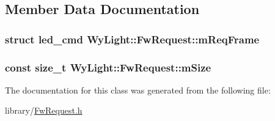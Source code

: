 \subsection{Member Data Documentation}
\hypertarget{class_wy_light_1_1_fw_request_a2c07f543884aab374e5de1c5c7e77b4e}{
\subsubsection[{m\-Req\-Frame}]{\setlength{\rightskip}{0pt plus 5cm}struct led\-\_\-cmd Wy\-Light\-::\-Fw\-Request\-::m\-Req\-Frame\hspace{0.3cm}{\ttfamily [protected]}}}\label{class_wy_light_1_1_fw_request_a2c07f543884aab374e5de1c5c7e77b4e}
\hypertarget{class_wy_light_1_1_fw_request_af224c579af518569cc8a6d32f533a8fb}{
\subsubsection[{m\-Size}]{\setlength{\rightskip}{0pt plus 5cm}const size\-\_\-t Wy\-Light\-::\-Fw\-Request\-::m\-Size\hspace{0.3cm}{\ttfamily [protected]}}}\label{class_wy_light_1_1_fw_request_af224c579af518569cc8a6d32f533a8fb}


The documentation for this class was generated from the following file\-:\begin{DoxyCompactItemize}
\item 
library/\hyperlink{_fw_request_8h}{Fw\-Request.\-h}\end{DoxyCompactItemize}
